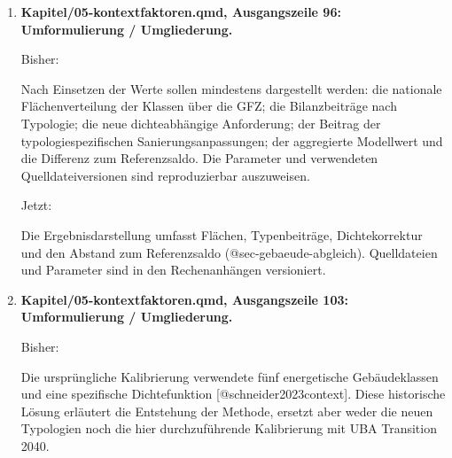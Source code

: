 \documentclass[
  ngerman,
  a4paper,
  DIV=11]{scrreprt}
\newenvironment{Shaded}{\begin{snugshade}}{\end{snugshade}}
\newcommand{\NormalTok}[1]{\textcolor[rgb]{0.00,0.23,0.31}{#1}}
\begin{document}
\begin{enumerate}
  Jetzt:

\begin{Shaded}
\begin{Highlighting}[]
\NormalTok{::: \{.callout{-}note title="Geltungsbereich des Entwurfs"\}}
\NormalTok{Die 2040{-}Flächenmatrix, Energieaggregation und GFZ{-}Zuordnung sind berechnet. Die historische Dichtefunktion wird als Referenzansatz ausgewertet. PEQ{-}Flächenanteile, Versorgungspfade, PE{-}Faktorversion und typologische Sanierungswerte sind nicht normativ festgelegt. Der Ergebnisvergleich beschreibt diesen Parameterstand.}
\end{Highlighting}
\end{Shaded}
\item
  \textbf{Kapitel/05-kontextfaktoren.qmd, Ausgangszeile 96:
  Umformulierung / Umgliederung.}

  Bisher:

\begin{Shaded}
\begin{Highlighting}[]
\NormalTok{Nach Einsetzen der Werte sollen mindestens dargestellt werden: die nationale Flächenverteilung der Klassen über die GFZ; die Bilanzbeiträge nach Typologie; die neue dichteabhängige Anforderung; der Beitrag der typologiespezifischen Sanierungsanpassungen; der aggregierte Modellwert und die Differenz zum Referenzsaldo. Die Parameter und verwendeten Quelldateiversionen sind reproduzierbar auszuweisen.}
\end{Highlighting}
\end{Shaded}

  Jetzt:

\begin{Shaded}
\begin{Highlighting}[]
\NormalTok{Die Ergebnisdarstellung umfasst Flächen, Typenbeiträge, Dichtekorrektur und den Abstand zum Referenzsaldo (@sec{-}gebaeude{-}abgleich). Quelldateien und Parameter sind in den Rechenanhängen versioniert.}
\end{Highlighting}
\end{Shaded}
\item
  \textbf{Kapitel/05-kontextfaktoren.qmd, Ausgangszeile 103:
  Umformulierung / Umgliederung.}

  Bisher:

\begin{Shaded}
\begin{Highlighting}[]
\NormalTok{Die ursprüngliche Kalibrierung verwendete fünf energetische Gebäudeklassen und eine spezifische Dichtefunktion [@schneider2023context]. Diese historische Lösung erläutert die Entstehung der Methode, ersetzt aber weder die neuen Typologien noch die hier durchzuführende Kalibrierung mit UBA Transition 2040.}
\end{Highlighting}
\end{Shaded}


\end{enumerate}
\end{document}
